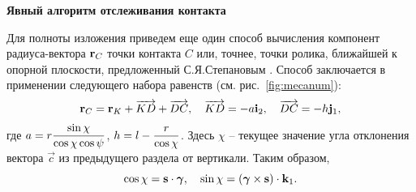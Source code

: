 % 


\textbf{Явный алгоритм отслеживания контакта}

Для полноты изложения приведем еще один способ вычисления компонент радиуса-вектора ${\bf r}_{C}$ точки контакта $C$ или, точнее, точки ролика, ближайшей к опорной плоскости, предложенный С.Я.Сте\-па\-но\-вым \cite{KosenkoGerasimov2015}. Способ заключается в применении следующего набора равенств (см. рис.~\ref{fig:mecanum}):
$$
{\bf r}_{C}={\bf r}_{K}+\overrightarrow{KD}+\overrightarrow{DC},\quad
\overrightarrow{KD}=-a{\bf i}_2,\quad\overrightarrow{DC}=-h{\bf j}_1,
$$
где $a = r\displaystyle\frac{\displaystyle \sin\chi}{\displaystyle \cos\chi\cos\psi}$, $h = l - \displaystyle\frac{\displaystyle r}{\displaystyle \cos\chi}$. Здесь $\chi$ -- текущее значение угла отклонения вектора $\vec{c}$ из предыдущего раздела от 
вертикали. Таким образом,
$$
    \cos\chi = \boldsymbol{\mathbf{s}} \cdot \boldsymbol{\mathbf{\gamma}}, \quad \sin\chi = 
    \left( \boldsymbol{\mathbf{\gamma}} \times \boldsymbol{\mathbf{s}} \right) \cdot {\bf k}_1.
$$
